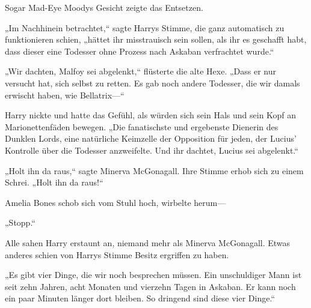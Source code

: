 Sogar Mad-Eye Moodys Gesicht zeigte das Entsetzen.

„Im Nachhinein betrachtet,“ sagte Harrys Stimme, die ganz automatisch zu funktionieren schien, „hättet ihr misstrauisch sein sollen, als ihr es geschafft habt, dass dieser eine Todesser ohne Prozess nach Askaban verfrachtet wurde.“

„Wir dachten, Malfoy sei abgelenkt,“ flüsterte die alte Hexe. „Dass er nur versucht hat, sich selbst zu retten. Es gab noch andere Todesser, die wir damals erwischt haben, wie Bellatrix—“

Harry nickte und hatte das Gefühl, als würden sich sein Hals und sein Kopf an Marionettenfäden bewegen.
„Die fanatischste und ergebenste Dienerin des Dunklen Lords, eine natürliche Keimzelle der Opposition für jeden, der Lucius' Kontrolle über die Todesser anzweifelte. Und ihr dachtet, Lucius sei abgelenkt.“

„Holt ihn da raus,“ sagte Minerva McGonagall. Ihre Stimme erhob sich zu einem Schrei. „Holt ihn da raus!“

Amelia Bones schob sich vom Stuhl hoch, wirbelte herum—

„Stopp.“

Alle sahen Harry erstaunt an, niemand mehr als Minerva McGonagall. Etwas anderes schien von Harrys Stimme Besitz ergriffen zu haben.

„Es gibt vier Dinge, die wir noch besprechen müssen. Ein unschuldiger Mann ist seit zehn Jahren, acht Monaten und vierzehn Tagen in Askaban. Er kann noch ein paar Minuten länger dort bleiben. So dringend sind diese vier Dinge.“

